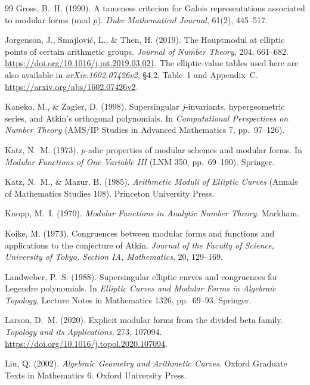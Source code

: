 \documentclass[11pt,a4paper]{article}
\numberwithin{equation}{section}
\theoremstyle{definition}
\theoremstyle{remark}
\begin{document}
\begin{thebibliography}{99}
 Gross, B.~H. (1990). A tameness criterion for Galois representations associated to modular forms (mod $p$). \emph{Duke Mathematical Journal}, 61(2), 445--517.

 Jorgenson, J., Smajlovi\'c, L., \& Then, H. (2019).
The Hauptmodul at elliptic points of certain arithmetic groups.
\emph{Journal of Number Theory}, 204, 661--682.
\url{https://doi.org/10.1016/j.jnt.2019.03.021}.
The elliptic-value tables used here are also available in
\emph{arXiv:1602.07426v2}, \S4.2, Table~1 and Appendix~C.
\url{https://arxiv.org/abs/1602.07426v2}.

 Kaneko, M., \& Zagier, D. (1998). Supersingular $j$-invariants,
hypergeometric series, and Atkin's orthogonal polynomials. In \emph{Computational Perspectives on Number
Theory} (AMS/IP Studies in Advanced Mathematics 7, pp.~97--126).

 Katz, N.~M. (1973). $p$-adic properties of modular schemes and modular forms.
In \emph{Modular Functions of One Variable III} (LNM 350, pp.~69--190). Springer.


 Katz, N.~M., \& Mazur, B. (1985). \emph{Arithmetic Moduli of Elliptic
Curves} (Annals of Mathematics Studies 108). Princeton University Press.

 Knopp, M.~I. (1970). \emph{Modular Functions in Analytic Number Theory}. Markham.

 Koike, M. (1973). Congruences between modular forms
and functions and applications to the conjecture of Atkin.
\emph{Journal of the Faculty of Science, University of Tokyo, Section IA, Mathematics},
20, 129--169.

 Landweber, P.~S. (1988). Supersingular elliptic curves and congruences for Legendre polynomials. In \emph{Elliptic Curves and Modular Forms in Algebraic Topology}, Lecture Notes in Mathematics 1326, pp.~69--93. Springer.

 Larson, D.~M. (2020). Explicit modular forms from the divided beta family. \emph{Topology and its Applications}, 273, 107094. \url{https://doi.org/10.1016/j.topol.2020.107094}.

 Liu, Q. (2002). \emph{Algebraic Geometry and Arithmetic Curves}. Oxford Graduate Texts in Mathematics 6. Oxford University Press.



\end{thebibliography}
\end{document}
